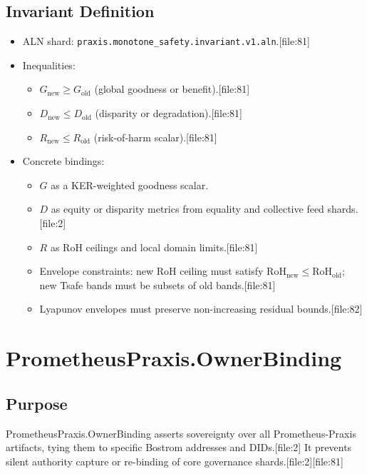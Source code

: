 \documentclass[11pt]{article}
\begin{document}
\subsection{Invariant Definition}

\begin{itemize}[nosep]
  \item ALN shard: \texttt{praxis.monotone\_safety.invariant.v1.aln}.[file:81]
  \item Inequalities:
    \begin{itemize}[nosep]
      \item \( G_{\text{new}} \geq G_{\text{old}} \) (global goodness or benefit).[file:81]
      \item \( D_{\text{new}} \leq D_{\text{old}} \) (disparity or degradation).[file:81]
      \item \( R_{\text{new}} \leq R_{\text{old}} \) (risk-of-harm scalar).[file:81]
    \end{itemize}
  \item Concrete bindings:
    \begin{itemize}[nosep]
      \item \( G \) as a KER-weighted goodness scalar.
      \item \( D \) as equity or disparity metrics from equality and collective feed shards.[file:2]
      \item \( R \) as RoH ceilings and local domain limits.[file:81]
      \item Envelope constraints: new RoH ceiling must satisfy \( \mathrm{RoH}_{\text{new}} \leq \mathrm{RoH}_{\text{old}} \); new Tsafe bands must be subsets of old bands.[file:81]
      \item Lyapunov envelopes must preserve non-increasing residual bounds.[file:82]
    \end{itemize}
\end{itemize}

\section{PrometheusPraxis.OwnerBinding}

\subsection{Purpose}

PrometheusPraxis.OwnerBinding asserts sovereignty over all Prometheus-Praxis artifacts, tying them to specific Bostrom addresses and DIDs.[file:2]
It prevents silent authority capture or re-binding of core governance shards.[file:2][file:81]
\end{document}
